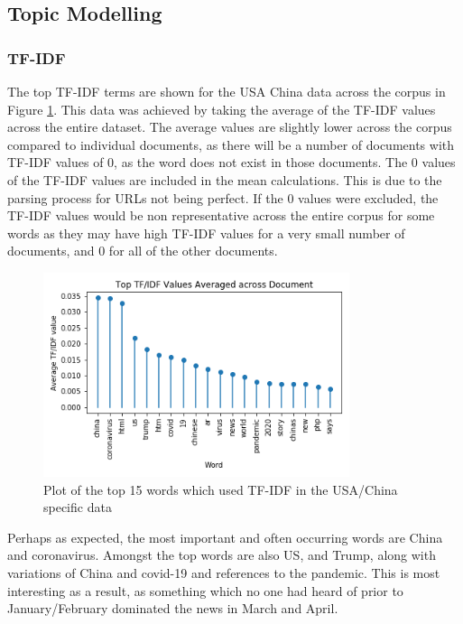 \subsection{Topic Modelling}
\subsubsection{TF-IDF}
The top TF-IDF terms are shown for the USA China data across the corpus in Figure \ref{fig:tfidfusachina}. This data was achieved by taking the average of the TF-IDF values across the entire dataset. The average values are slightly lower across the corpus compared to individual documents, as there will be a number of documents with TF-IDF values of 0, as the word does not exist in those documents. The 0 values of the TF-IDF values are included in the mean calculations. This is due to the parsing process for URLs not being perfect. If the 0 values were excluded, the TF-IDF values would be non representative across the entire corpus for some words as they may have high TF-IDF values for a very small number of documents, and 0 for all of the other documents.

\begin{figure}[H]
	\centering
	\includegraphics[width=0.8\textwidth]{Images/usa_stem_tfidf.png}
	\caption{Plot of the top 15 words which used TF-IDF in the USA/China specific data}
	\label{fig:tfidfusachina}
\end{figure}

Perhaps as expected, the most important and often occurring words are China and coronavirus.  Amongst the top words are also US, and Trump, along with variations of China and covid-19 and references to the pandemic. This is most interesting as a result, as something which no one had heard of prior to January/February dominated the news in March and April.

